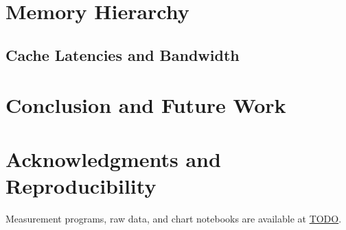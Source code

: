 \documentclass[conference,table,xcdraw,10pt,final]{IEEEtran}
\begin{document}
	\section{Memory Hierarchy}
	\subsection{Cache Latencies and Bandwidth}

	\section{Conclusion and Future Work}
	\label{sec:summary}
	
	\section*{Acknowledgments and Reproducibility}
	Measurement programs, raw data, and chart notebooks are available at \url{TODO}.
	
	
	
	
	
\end{document}
